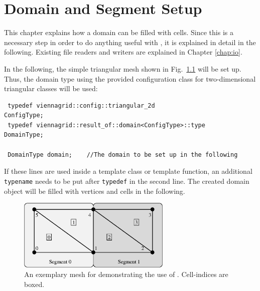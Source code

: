 \chapter{Domain and Segment Setup} \label{chap:domainsetup}

 

This chapter explains how a {\ViennaGrid} domain can be filled with cells. Since this
is a necessary step in order to do anything useful with {\ViennaGrid}, it is explained in detail in the following.
Existing file readers and writers are explained in Chapter \ref{chap:io}.


In the following, the simple triangular mesh shown in Fig.~\ref{fig:sampledomain} will be set up.
Thus, the domain type using the provided configuration class for two-dimensional triangular classes will be used:
\begin{lstlisting}
 typedef viennagrid::config::triangular_2d                  ConfigType;
 typedef viennagrid::result_of::domain<ConfigType>::type    DomainType;

 DomainType domain;    //The domain to be set up in the following
\end{lstlisting}
If these lines are used inside a template class or template function, an additional \lstinline|typename| needs to be put after \lstinline|typedef| in the second line.
The created domain object will be filled with vertices and cells in the following.

\begin{figure}[tb]
\centering
 \includegraphics[width=0.65\textwidth]{figures/sampledomain.eps}
 \caption{An exemplary mesh for demonstrating the use of {\ViennaGrid}. Cell-indices are boxed.}
 \label{fig:sampledomain}
\end{figure}


